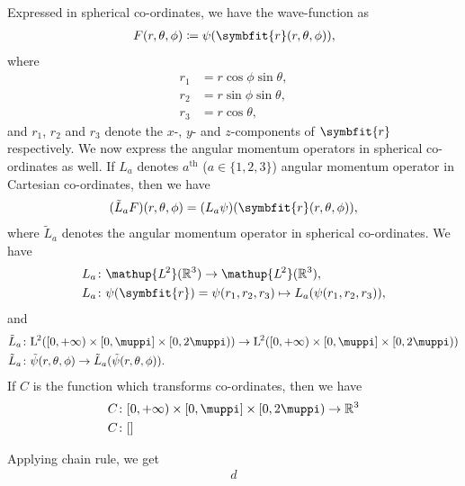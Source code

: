 \documentclass[12pt, a4 paper]{article}
\theoremstyle{definition}
\newcommand{\ltwo}{\mathup{L\kern-0.7pt^2}}
\newcommand{\ltworthree}{\ltwo(\rr^3)}
\newcommand{\rthree}{\mathbb{R}^3}
\newcommand{\rr}{\mathbb{R}}
\renewcommand{\pi}{\muppi}
\newcommand{\rvec}{\symbfit{r}}
\begin{document}
	Expressed in spherical co-ordinates, we have the wave-function as
	\begin{align*}
	    F(r, \theta, \phi) \coloneq \psi(\rvec(r, \theta, \phi)),
	\end{align*}
	where
	\begin{align*}
		r_1 &= r \cos{\phi} \sin{\theta},\\
		r_2 &= r \sin{\phi} \sin{\theta},\\
		r_3 &= r \cos{\theta},
	\end{align*}
	and $r_1$, $r_2$ and $r_3$ denote the $x$-, $y$- and $z$-components of $\rvec$ respectively. We now express the angular momentum operators in spherical co-ordinates as well. If $L_a$ denotes $a^{\text{th}}$ ($a \in \{1,2,3\}$) angular momentum operator in Cartesian co-ordinates, then we have
	\begin{align*}
		(\tilde{L}_a F) (r, \theta, \phi) = (L_a \psi)(\rvec(r, \theta, \phi)),
	\end{align*}
	where $\tilde{L}_a$ denotes the angular momentum operator in spherical co-ordinates. We have
	\begin{align*}
	    L_a &\colon \ltworthree \rightarrow \ltworthree,\\
		L_a &\colon \psi(\rvec) = \psi(r_1, r_2, r_3) \mapsto L_a(\psi(r_1, r_2, r_3)),
	\end{align*}
	and
	\begin{align*}
		\tilde{L}_a &\colon \mathrm{L}^{\kern-0.7pt 2} ( [0,+\infty ) \times [0,\pi] \times [0,2\pi ) ) \rightarrow \mathrm{L}^{\kern-0.7pt 2}  ( [0,+\infty ) \times [0,\pi ] \times [0,2\pi ) )\\
		\tilde{L}_a &\colon \tilde{\psi}(r, \theta, \phi) \rightarrow \tilde{L}_a(\tilde{\psi}(r, \theta, \phi)).
	\end{align*}
	If $C$ is the function which transforms co-ordinates, then we have
	\begin{align*}
		C &\colon [0,+\infty ) \times [0,\pi] \times [0,2\pi ) \rightarrow \rthree\\
		C &\colon []
	\end{align*}


	Applying chain rule, we get
	\begin{align*}
d
	\end{align*}
\end{document}
